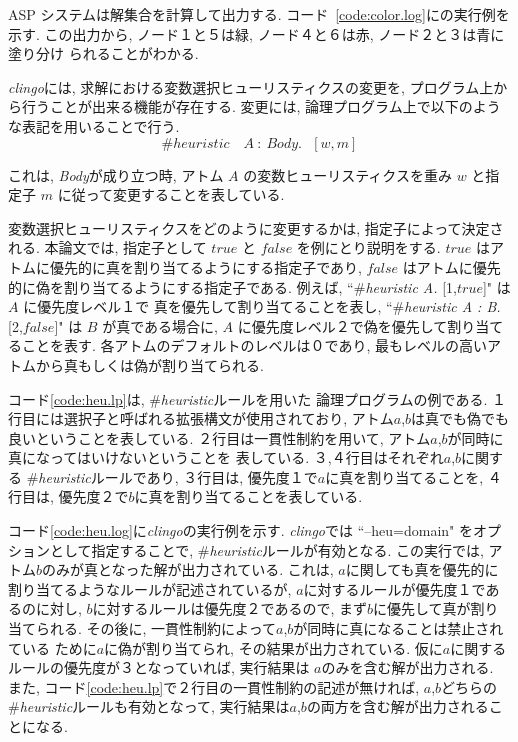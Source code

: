 ASP システムは解集合を計算して出力する. 
コード~\ref{code:color.log}に{\clingo}の実行例を示す. 
この出力から, ノード１と５は緑, ノード４と６は赤, ノード２と３は青に塗り分け
られることがわかる. 

\textit{clingo}には, 求解における変数選択ヒューリスティクスの変更を, 
プログラム上から行うことが出来る機能が存在する. 
変更には, 論理プログラム上で以下のような表記を用いることで行う. 
\begin{displaymath}
\#heuristic \quad A~ : ~Body. ~~~[w,m]
\end{displaymath}

これは, \textit{Body}が成り立つ時, アトム $A$ の変数ヒューリスティクスを重み
 $w$ と指定子 $m$ に従って変更することを表している. 

変数選択ヒューリスティクスをどのように変更するかは, 指定子によって決定される. 
本論文では, 指定子として $true$ と $false$ を例にとり説明をする. 
$true$ はアトムに優先的に真を割り当てるようにする指定子であり, 
$false$ はアトムに優先的に偽を割り当てるようにする指定子である. 
例えば, ``\#\textit{heuristic A.} [1,$true$]" は $A$ に優先度レベル１で
真を優先して割り当てることを表し, 
``\#\textit{heuristic A : B.} [2,$false$]" は $B$ が真である場合に, 
$A$ に優先度レベル２で偽を優先して割り当てることを表す. 
各アトムのデフォルトのレベルは０であり, 
最もレベルの高いアトムから真もしくは偽が割り当てられる. 

コード\ref{code:heu.lp}は, \#\textit{heuristic}ルールを用いた
論理プログラムの例である. 
１行目には選択子と呼ばれる拡張構文が使用されており, 
アトム$a$,$b$は真でも偽でも良いということを表している. 
２行目は一貫性制約を用いて, 
アトム$a$,$b$が同時に真になってはいけないということを
表している.  
３,４行目はそれぞれ$a$,$b$に関する
\#\textit{heuristic}ルールであり, 
３行目は, 優先度１で$a$に真を割り当てることを, 
４行目は, 優先度２で$b$に真を割り当てることを表している. 

コード\ref{code:heu.log}に\textit{clingo}の実行例を示す. 
\textit{clingo}では ``--heu=domain" をオプションとして指定することで, 
\#\textit{heuristic}ルールが有効となる. 
この実行では, アトム$b$のみが真となった解が出力されている. 
これは, $a$に関しても真を優先的に割り当てるようなルールが記述されているが, 
$a$に対するルールが優先度１であるのに対し, $b$に対するルールは優先度２であるので, 
まず$b$に優先して真が割り当てられる. 
その後に, 一貫性制約によって$a$,$b$が同時に真になることは禁止されている
ために$a$に偽が割り当てられ, その結果が出力されている. 
仮に$a$に関するルールの優先度が３となっていれば, 実行結果は
$a$のみを含む解が出力される. 
また, コード\ref{code:heu.lp}で２行目の一貫性制約の記述が無ければ, 
$a$,$b$どちらの\#\textit{heuristic}ルールも有効となって, 
実行結果は$a$,$b$の両方を含む解が出力されることになる. 







